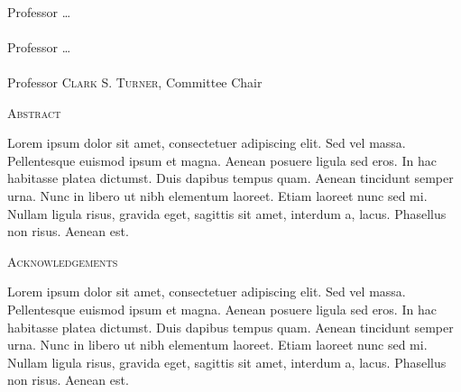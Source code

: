 \documentclass[12pt]{report}
\newcommand{\committeechair}{\textsc{Clark S. Turner}}
\newcommand{\committeeA}{\textsc{\ldots}}
\newcommand{\committeeB}{\textsc{\ldots}}
\begin{document}
\singlespace
\noindent\makebox[4in]{\hrulefill}\\
Professor \committeeA\\[2cm]

\noindent\makebox[4in]{\hrulefill}\\
Professor \committeeB\\[2cm]

\noindent\makebox[4in]{\hrulefill}\\
Professor \committeechair, Committee Chair\\[4cm]

\doublespace

\newpage

\begin{center}\textsc{\large Abstract}\\[1cm]\end{center}

Lorem ipsum dolor sit amet, consectetuer adipiscing elit. Sed vel massa.
Pellentesque euismod ipsum et magna. Aenean posuere ligula sed eros. In hac
habitasse platea dictumst. Duis dapibus tempus quam. Aenean tincidunt semper
urna. Nunc in libero ut nibh elementum laoreet. Etiam laoreet nunc sed mi.
Nullam ligula risus, gravida eget, sagittis sit amet, interdum a, lacus.
Phasellus non risus. Aenean est.

\newpage

\begin{center}\textsc{\large Acknowledgements}\\[1cm]\end{center}

Lorem ipsum dolor sit amet, consectetuer adipiscing elit. Sed vel massa.
Pellentesque euismod ipsum et magna. Aenean posuere ligula sed eros. In hac
habitasse platea dictumst. Duis dapibus tempus quam. Aenean tincidunt semper
urna. Nunc in libero ut nibh elementum laoreet. Etiam laoreet nunc sed mi.
Nullam ligula risus, gravida eget, sagittis sit amet, interdum a, lacus.
Phasellus non risus. Aenean est.

\tableofcontents







\end{document}

